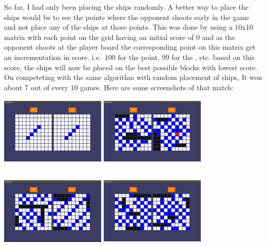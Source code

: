 \documentclass{article}
\begin{document}
	So far, I had only been placing the ships randomly. A better way to place the ships would be to see the points where the opponent shoots early in the game and not place any of the ships at those points. This was done by using a 10x10 matrix with each point on the grid having an initial score of $0$ and as the opponent shoots at the player board the corresponding point on this matrix get an incrementation in score. i.e.\ $100$ for the  point, $99$ for the , etc. based on this score, the ships will now be placed on the best possible blocks with lowest score. On competeting with the same algorithm with random placement of ships, It won about $7$ out of every $10$ games. Here are some screenshots of that match:\newline\newline
\includegraphics[width=5cm, height=4cm]{shot1}\hspace{2cm}
\includegraphics[width=5cm, height=4cm]{shot2}\hspace{2cm}
\includegraphics[width=5cm, height=4cm]{shot3}\hspace{2cm}
\includegraphics[width=5cm, height=4cm]{shot4}\hspace{2cm}
\end{document}
